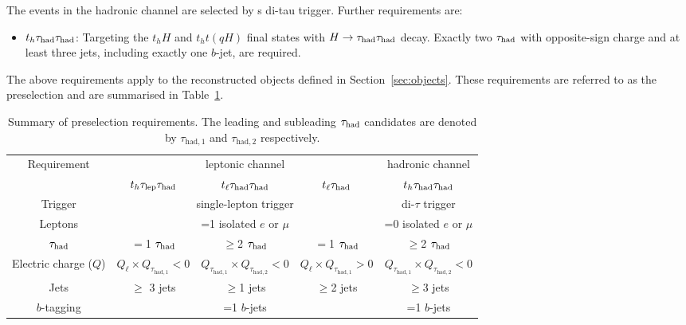 \documentclass[PAPER, coverpage, atlasdraft=true, texlive=2016, UKenglish]{\ATLASLATEXPATH atlasdoc} %
\begin{document}
The events in the hadronic channel are selected by s di-tau trigger. Further requirements are:
\begin{itemize}
\item $t_h\tau_{\mathrm{had}} \tau_{\mathrm{had}}$: Targeting the $t_hH$ and $t_ht(qH)$ final states with $H\to\tau_{\mathrm{had}} \tau_{\mathrm{had}}$ decay. Exactly two $\tau_{\mathrm{had}}$ with opposite-sign charge and at least three jets, including exactly one $b$-jet, are required.
\end{itemize}

The above requirements apply to the reconstructed objects defined in Section~\ref{sec:objects}.
These requirements are referred to as the preselection and are summarised in Table~\ref{tab:preselection}. 

\begin{table}[t!]
\caption{\small{Summary of preselection requirements. 
The leading and subleading $\tau_{\mathrm{had}}$ candidates are denoted by $\tau_{\mathrm{had,1}}$ and $\tau_{\mathrm{had,2}}$ respectively.}}
\begin{center}
\begin{tabular}{c|ccc|c}
\toprule\toprule
\multirow{2}{*}{Requirement} &  \multicolumn{3}{c|}{leptonic channel}  & \multicolumn{1}{c}{hadronic channel} \\ 
& $t_h\tau_{\mathrm{lep}} \tau_{\mathrm{had}}$ & $t_{\ell}\tau_{\mathrm{had}} \tau_{\mathrm{had}}$ &  $t_{\ell}\tau_{\mathrm{had}}$ & $t_h\tau_{\mathrm{had}} \tau_{\mathrm{had}}$\\
\midrule
Trigger & \multicolumn{3}{c|}{single-lepton trigger} & di-$\tau$ trigger  \\
Leptons  & \multicolumn{3}{c|}{=1 isolated $e$ or $\mu$}  & =0 isolated $e$ or $\mu$ \\
$\tau_{\mathrm{had}}$  & $=$1 $\tau_{\mathrm{had}}$ & $\geq$2 $\tau_{\mathrm{had}}$ & $=$1 $\tau_{\mathrm{had}}$ & $\geq$2 $\tau_{\mathrm{had}}$ \\
Electric charge ($Q$) & $Q_\ell \times Q_{\tau_{\mathrm{had,1}}} < 0$ & $Q_{\tau_{\mathrm{had,1}}} \times Q_{\tau_{\mathrm{had,2}}} < 0$ & $Q_\ell \times Q_{\tau_{\mathrm{had,1}}} > 0$ & $Q_{\tau_{\mathrm{had,1}}} \times Q_{\tau_{\mathrm{had,2}}} < 0$ \\
Jets  &   $\geq$ 3 jets & $\geq$1 jets & $\geq$2 jets & $\geq$3 jets \\
$b$-tagging & \multicolumn{3}{c|}{=1 $b$-jets} & =1 $b$-jets\\
\bottomrule\bottomrule
\end{tabular}
\label{tab:preselection}
\end{center}
\end{table}
\end{document}
